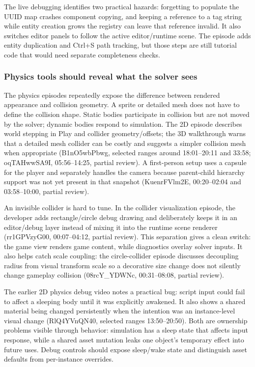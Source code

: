 The live debugging identifies two practical hazards: forgetting to populate the UUID map crashes component copying, and keeping a reference to a tag string while entity creation grows the registry can leave that reference invalid. It also switches editor panels to follow the active editor/runtime scene. The episode adds entity duplication and Ctrl+S path tracking, but those steps are still tutorial code that would need separate completeness checks.

\subsubsection{Physics tools should reveal what the solver sees}\label{physics-tools-should-reveal-what-the-solver-sees}

The physics episodes repeatedly expose the difference between rendered appearance and collision geometry. A sprite or detailed mesh does not have to define the collision shape. Static bodies participate in collision but are not moved by the solver; dynamic bodies respond to simulation. The 2D episode describes world stepping in Play and collider geometry/offsets; the 3D walkthrough warns that a detailed mesh collider can be costly and suggests a simpler collision mesh when appropriate (B1nO5wbPbwg, selected ranges around 18:01--20:11 and 33:58; oqTAHwwSA9I, 05:56--14:25, partial review). A first-person setup uses a capsule for the player and separately handles the camera because parent-child hierarchy support was not yet present in that snapshot (KuenrFVlm2E, 00:20--02:04 and 03:58--10:00, partial review).

An invisible collider is hard to tune. In the collider visualization episode, the developer adds rectangle/circle debug drawing and deliberately keeps it in an editor/debug layer instead of mixing it into the runtime scene renderer (rr1GPVzyG00, 00:07--04:12, partial review). This separation gives a clean switch: the game view renders game content, while diagnostics overlay solver inputs. It also helps catch scale coupling: the circle-collider episode discusses decoupling radius from visual transform scale so a decorative size change does not silently change gameplay collision (08rcY\_YDWNc, 00:31--08:08, partial review).

The earlier 2D physics debug video notes a practical bug: script input could fail to affect a sleeping body until it was explicitly awakened. It also shows a shared material being changed persistently when the intention was an instance-level visual change (RlQ4YVnQN40, selected ranges 13:50--20:50). Both are ownership problems visible through behavior: simulation has a sleep state that affects input response, while a shared asset mutation leaks one object's temporary effect into future uses. Debug controls should expose sleep/wake state and distinguish asset defaults from per-instance overrides.

